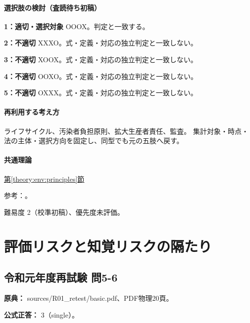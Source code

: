 \paragraph{選択肢の検討（査読待ち初稿）}\mbox{}\par

\noindent\textbf{1：適切・選択対象} OOOX。判定と一致する。\par

\noindent\textbf{2：不適切} XXXO。式・定義・対応の独立判定と一致しない。\par

\noindent\textbf{3：不適切} XOOX。式・定義・対応の独立判定と一致しない。\par

\noindent\textbf{4：不適切} OOXO。式・定義・対応の独立判定と一致しない。\par

\noindent\textbf{5：不適切} OXXX。式・定義・対応の独立判定と一致しない。\par

\paragraph{再利用する考え方} ライフサイクル、汚染者負担原則、拡大生産者責任、監査。 集計対象・時点・法の主体・選択方向を固定し、同型でも元の五肢へ戻す。

\paragraph{共通理論} \hyperref[theory:env:principles]{第\ref*{theory:env:principles}節}

\par 参考：\cite{env59_epr}。

\par 難易度 2（校準初稿）、優先度未評価。

\section{評価リスクと知覚リスクの隔たり}

\subsection{令和元年度再試験 問5-6}
\label{q:r01-ret-basic-5-6}

\noindent\textbf{原典：} sources/R01\_retest/basic.pdf、PDF物理20頁。

\textbf{公式正答：} 3（single）。

